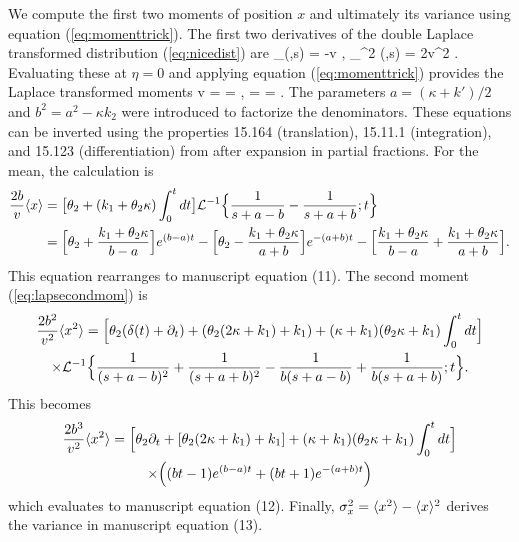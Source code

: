 We compute the first two moments of position $x$ and ultimately its variance using equation (\ref{eq:momenttrick}). The first two derivatives of the double Laplace transformed distribution (\ref{eq:nicedist}) are
\be \partial_\eta \tp(\eta,s) = -v ,\ee
\be \partial_\eta^2 \tp(\eta,s) = 2v^2  .\ee
Evaluating these at $\eta=0$ and applying equation (\ref{eq:momenttrick}) provides the Laplace transformed moments
\be  {} {v} =  =  \label{eq:lapmean},\ee
\be {} =  =  .\label{eq:lapsecondmom}\ee
The parameters $a= (\kappa+k')/2$ and $b^2 = a^2 -\kappa k_2$ were introduced to factorize the denominators.
These equations can be inverted using the properties 15.164 (translation), 15.11.1 (integration), and 15.123 (differentiation) from  \citet{Arfken1985} after expansion in partial fractions.
For the mean, the calculation is
\begin{align}
	\frac{2b}{v}\langle x \rangle &= \big[\theta_2 + (k_1+\theta_2 \kappa)\int_0^t dt\big]\mathcal{L}^{-1}\Big\{ \frac{1}{s+a-b}-\frac{1}{s+a+b};t\Big\}\\
	&= \Big[\theta_2 + \frac{k_1+\theta_2\kappa}{b-a}\Big]e^{(b-a)t} - \Big[\theta_2 - \frac{k_1+\theta_2\kappa}{a+b}\Big]e^{-(a+b)t} - \Big[\frac{k_1+\theta_2\kappa}{b-a} + \frac{k_1+\theta_2\kappa}{a+b}\Big].
\end{align}
This equation rearranges to manuscript equation (11).
The second moment (\ref{eq:lapsecondmom}) is 
\begin{multline}
	\frac{2b^2}{v^2}\langle x^2 \rangle = \Big[\theta_2(\delta(t) + \partial_t) + (\theta_2(2\kappa + k_1)+k_1) + (\kappa+k_1)(\theta_2\kappa+k_1)\int_0^t dt \Big] \\
	\times \mathcal{L}^{-1}\Big\{ \frac{1}{(s+a-b)^2} + \frac{1}{(s+a+b)^2}-\frac{1}{b(s+a-b)}+\frac{1}{b(s+a+b)};t\Big\}.
\end{multline}
This becomes 
\begin{multline}
	\frac{2b^3}{v^2}\langle x^2 \rangle = \Big[\theta_2\partial_t + [\theta_2(2\kappa+k_1)+k_1] + (\kappa+k_1)(\theta_2\kappa+k_1)\int_0^tdt\Big]\\
	\times \Big((bt-1)e^{(b-a)t}+(bt+1)e^{-(a+b)t}\Big)
\end{multline}
which evaluates to manuscript equation (12).
Finally, $\sigma_x^2 = \langle x^2 \rangle - \langle x \rangle^2$ derives the variance in manuscript equation (13).


